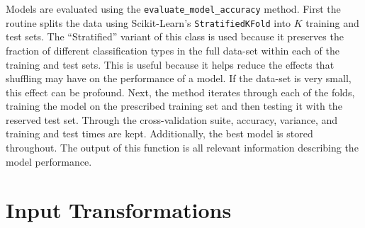 \documentclass[paper=a4, fontsize=11pt]{scrartcl} %
\begin{document}
Models are evaluated using the \verb|evaluate_model_accuracy| method.
First the routine splits the data using Scikit-Learn's \verb|StratifiedKFold| into $K$ training and test sets.
The ``Stratified'' variant of this class is used because it preserves the fraction of different classification types in the full data-set within each of the training and test sets.
This is useful because it helps reduce the effects that shuffling may have on the performance of a model.
If the data-set is very small, this effect can be profound.
Next, the method iterates through each of the folds, training the model on the prescribed training set and then testing it with the reserved test set.
Through the cross-validation suite, accuracy, variance, and training and test times are kept.
Additionally, the best model is stored throughout.
The output of this function is all relevant information describing the model performance.

\section{Input Transformations} \label{sec: input scaling}
\end{document}
